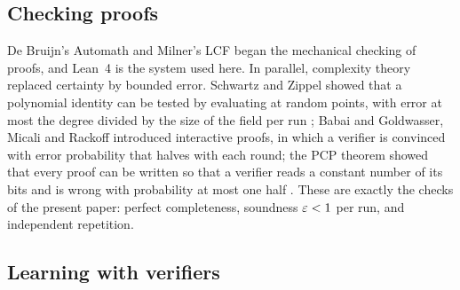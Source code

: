\subsection{Checking proofs}

De Bruijn's Automath \cite{dB70} and Milner's LCF \cite{GMW79} began the mechanical checking of proofs, and Lean~4 \cite{MU21} is the system used here. In parallel, complexity theory replaced certainty by bounded error. Schwartz and Zippel showed that a polynomial identity can be tested by evaluating at random points, with error at most the degree divided by the size of the field per run \cite{Sch80,Zip79}; Babai \cite{Bab85} and Goldwasser, Micali and Rackoff \cite{GMR89} introduced interactive proofs, in which a verifier is convinced with error probability that halves with each round; the PCP theorem showed that every proof can be written so that a verifier reads a constant number of its bits and is wrong with probability at most one half \cite{AS98,ALM98}. These are exactly the checks of the present paper: perfect completeness, soundness $\varepsilon<1$ per run, and independent repetition.

\subsection{Learning with verifiers}

